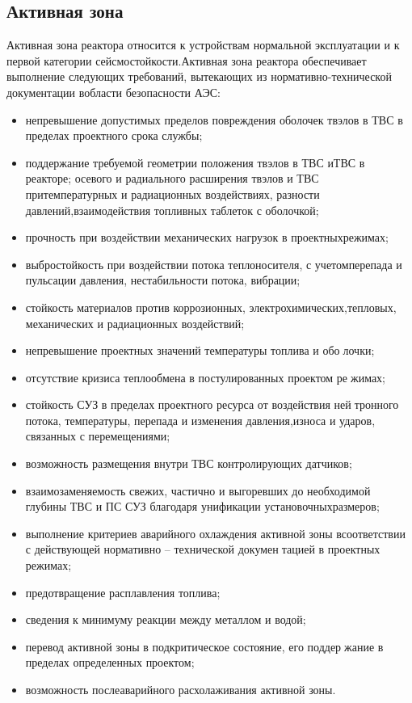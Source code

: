 \documentclass[14pt]{article}
\begin{document}
	\subsection{Активная зона}
	\hspace{0.4cm}
	Активная зона реактора относится к устройствам нормальной эксплуатации и к первой категории сейсмостойкости.Активная зона реактора обеспечивает выполнение следующих требований,  вытекающих  из  нормативно-технической  документации  вобласти безопасности АЭС:
	
	\begin{itemize}
	    \item 	непревышение  допустимых  пределов  повреждения  оболочек  твэлов в ТВС в пределах проектного срока службы;
	\item поддержание  требуемой  геометрии  положения  твэлов  в  ТВС  иТВС в реакторе;
	 осевого и радиального расширения твэлов и ТВС притемпературных и радиационных воздействиях, разности давлений,взаимодействия топливных таблеток с оболочкой;
	\item прочность  при  воздействии  механических  нагрузок  в  проектныхрежимах;
	\item выбростойкость  при  воздействии  потока  теплоносителя,  с  учетомперепада и пульсации давления, нестабильности потока, вибрации;
	\item стойкость материалов против коррозионных, электрохимических,тепловых, механических и радиационных воздействий;
	\item непревышение  проектных  значений  температуры  топлива  и  оболочки;
	\item отсутствие кризиса теплообмена в постулированных проектом режимах;
	\item стойкость СУЗ в пределах проектного ресурса от воздействия нейтронного  потока,  температуры,  перепада  и  изменения  давления,износа и ударов, связанных с перемещениями;
	\item возможность размещения внутри ТВС контролирующих датчиков;
	\item взаимозаменяемость свежих, частично и выгоревших до необходимой глубины ТВС и ПС СУЗ благодаря унификации установочныхразмеров;
	\item выполнение  критериев  аварийного  охлаждения  активной  зоны  всоответствии с действующей нормативно – технической документацией в проектных режимах;
	\item предотвращение расплавления топлива;
	\item сведения к минимуму реакции между металлом и водой;
	\item перевод  активной  зоны  в  подкритическое  состояние,  его  поддержание в пределах определенных проектом;
	\item возможность послеаварийного расхолаживания активной зоны.
	\end{itemize}
	
\end{document}
